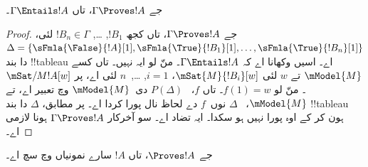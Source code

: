 \documentclass[../../../include/open-logic-section]{subfiles}
\begin{document}
\begin{cor}
جے $\Gamma \Proves !A$، تاں $\Gamma \Entails !A$۔
\end{cor}

\begin{proof}
  جے $\Gamma \Proves !A$، تاں کجھ $!B_1$, \dots, $!B_n \in
  \Gamma$ لئی، $\Delta = \{\sFmla{\False}{!A}[1], \sFmla{\True}{!B_1}[1],
  \dots, \sFmla{\True}{!B_n}[1]\}$ دا بند !!{tableau} اے۔
  اسیں وکھانا اے کہ $\Gamma \Entails !A$۔ منّ لو ایہ نہیں۔ تاں کسے
  $\mModel{M}$ تے $w$ لئی $\mSat{M}{!B_i}[w]$، $i=1$, \dots,~$n$
  لئی اے، پر $\mSat/{M}{!A}[w]$۔ منّ لو $f(1) = w$۔ تاں $f$،
  ~$P(\Delta)$ دی~$\mModel{M}$ وچ تعبیر اے، تے $\mModel{M}$،
  ~$\Delta$ نوں~$f$ دے لحاظ نال پورا کردا اے۔ پر
   مطابق، $\Delta$ دا بند !!{tableau} ہون
  کر کے اوہ پورا نہیں ہو سکدا۔ ایہ تضاد اے۔ سو آخرکار
  $\Gamma \Proves !A$ ہونا لازمی اے۔
\end{proof}

\begin{cor}
جے $\Proves !A$، تاں $!A$ سارے نمونیاں وچ سچ اے۔
\end{cor}
\end{document}
